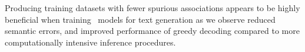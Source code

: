 Producing training datasets with fewer spurious associations appears to be
highly beneficial when training \sequencetosequence~models for text generation
as we observe reduced semantic errors, and improved performance of greedy
decoding compared to more computationally intensive inference procedures.






%
%
%
%
%
%
%
%
%
%
%
%
%
%
%
%
%
%
%
%
%
%
%
%
%
%
%
%
%
%
%
%
%
%
